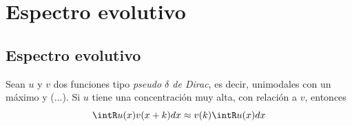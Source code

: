 
\chapter{Espectro evolutivo}


\section{Espectro evolutivo}

\begin{proposicion}
Sean $u$ y $v$ dos funciones tipo \textit{pseudo $\delta$ de Dirac}, es decir, unimodales con un
máximo  y (...). Si $u$ tiene una concentración muy alta, con relación a $v$, entonces
\begin{equation*}
\intR u(x) v(x+k) dx \approx v(k) \intR u(x) dx
\end{equation*}
\label{pseudo_d}
\end{proposicion}


